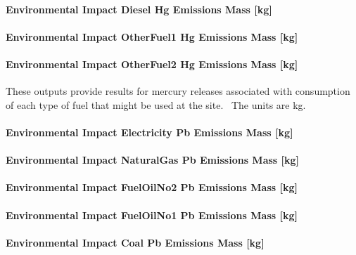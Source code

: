 \paragraph{Environmental Impact Diesel Hg Emissions Mass {[}kg{]}}\label{environmental-impact-diesel-hg-emissions-mass-kg}

\paragraph{Environmental Impact OtherFuel1 Hg Emissions Mass {[}kg{]}}\label{environmental-impact-otherfuel1-hg-emissions-mass-kg}

\paragraph{Environmental Impact OtherFuel2 Hg Emissions Mass {[}kg{]}}\label{environmental-impact-otherfuel2-hg-emissions-mass-kg}

These outputs provide results for mercury releases associated with consumption of each type of fuel that might be used at the site.~ The units are kg.

\paragraph{Environmental Impact Electricity Pb Emissions Mass {[}kg{]}}\label{environmental-impact-electricity-pb-emissions-mass-kg}

\paragraph{Environmental Impact NaturalGas Pb Emissions Mass {[}kg{]}}\label{environmental-impact-natural-gas-pb-emissions-mass-kg}

\paragraph{Environmental Impact FuelOilNo2 Pb Emissions Mass {[}kg{]}}\label{environmental-impact-fuel-oil-2-pb-emissions-mass-kg}

\paragraph{Environmental Impact FuelOilNo1 Pb Emissions Mass {[}kg{]}}\label{environmental-impact-fuel-oil-1-pb-emissions-mass-kg}

\paragraph{Environmental Impact Coal Pb Emissions Mass {[}kg{]}}\label{environmental-impact-coal-pb-emissions-mass-kg}

